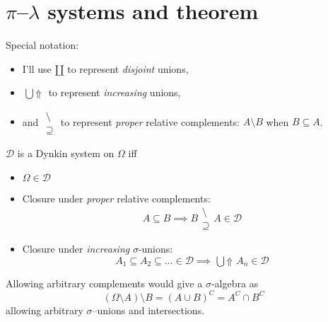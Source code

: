 \documentclass{scrartcl}
\newcommand{\measpace}{\Omega}
\newcommand{\system}{\mathcal D}
\newcommand{\propersetminus}{\begin{smallmatrix} \setminus\\\supseteq \end{smallmatrix}}%
\newcommand{\disjunion}{\amalg}
\DeclareMathOperator*{\upunion}{\bigcup\!\!\Uparrow\!}
\newcommand{\figinput}[1]{}%
\begin{document}
\section{\(\pi\)--\(\lambda\) systems and theorem}
Special notation:
\begin{itemize}
\item I'll use \(\disjunion\) to represent \emph{disjoint} unions,
\item  \(\upunion\) to
  represent \emph{increasing} unions,
\item and \(\propersetminus\) to represent
  \emph{proper} relative complements: \(A\setminus B\) when \(B\subseteq A\).
\end{itemize}
\begin{defn} \label{original dynkin system def}
  \(\system\) is a Dynkin system on \(\measpace\) iff
  \begin{itemize}
  \item \(\measpace\in\system\)
  \item Closure under \emph{proper} relative complements:
    \[
      A\subseteq B \implies B\propersetminus A \in \system
    \]
  \item  Closure under \emph{increasing} \(\sigma\)-unions:
    \[
      A_1\subseteq A_2 \subseteq \dots \in \system \implies \upunion A_n \in \system
    \]
  \end{itemize}
\end{defn}
Allowing arbitrary complements would give a \(\sigma\)-algebra as
\[
  (\measpace\setminus A)\setminus B = (A\cup B)^C = A^C \cap B^C
\]
allowing arbitrary \(\sigma\)--unions and intersections.

 \figinput{relcomp.pdf_tex}
\end{document}
